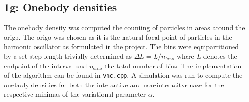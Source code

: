 \subsection*{\textbf{1g:} Onebody densities}

The onebody density was computed the counting of particles in areas around the origo. The origo was chosen as it is the natural focal point of particles in the harmonic oscillator as formulated in the project. The bins were equipartitioned by a set step length trivially determined as $\Delta L = L/n_{bins}$ where $L$ denotes the endpoint of the interval and $n_{bins}$ the total number of bins. The implementation of the algorithm can be found in \lstinline{vmc.cpp}. A simulation was run to compute the onebody densities for both the interactive and non-interacitve case for the respective minimas of the variational parameter $\alpha$. 

